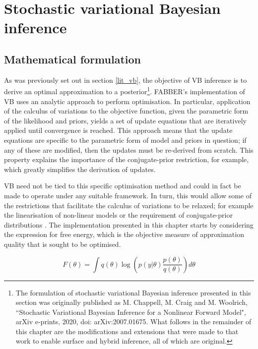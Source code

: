 \section{Stochastic variational Bayesian inference}

\subsection{Mathematical formulation}

As was previously set out in section \ref{lit_vb}, the objective of VB inference is to derive an optimal approximation to a posterior\footnote{The formulation of stochastic variational Bayesian inference presented in this section was originally published as M. Chappell, M. Craig and M. Woolrich, ``Stochastic Variational Bayesian Inference for a Nonlinear Forward Model", arXiv e-prints, 2020, doi: arXiv:2007.01675. What follows in the remainder of this chapter are the modifications and extensions that were made to that work to enable surface and hybrid inference, all of which are original.}. FABBER's implementation of VB uses an analytic approach to perform optimisation. In particular, application of the calculus of variations to the objective function, given the parametric form of the likelihood and priors, yields a set of update equations that are iteratively applied until convergence is reached. This approach means that the update equations are specific to the parametric form of model and priors in question; if any of these are modified, then the updates must be re-derived from scratch. This property explains the importance of the conjugate-prior restriction, for example, which greatly simplifies the derivation of updates. 

VB need not be tied to this specific optimisation method and could in fact be made to operate under any suitable framework. In turn, this would allow some of the restrictions that facilitate the calculus of variations to be relaxed; for example the linearisation of non-linear models or the requirement of conjugate-prior distributions \cite{Chappell2009}. The implementation presented in this chapter starts by considering the expression for free energy, which is the objective measure of approximation quality that is sought to be optimised. 

\begin{equation}
\label{free_energy}
F(\theta) = \int q(\theta) \log \left( p(y|\theta) \frac{p(\theta)}{q(\theta)} \right) d\theta
\end{equation}


